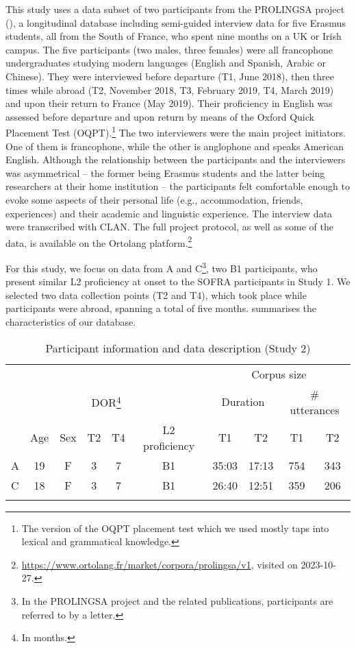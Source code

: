 \documentclass[output=paper]{langscibook}
\begin{document}
This study uses a data subset of two participants from the PROLINGSA project (\citealt{LeclercqEtAl2021}), a longitudinal database including semi-guided interview data for five Erasmus students, all from the South of France, who spent nine months on a UK or Irish campus. The five participants (two males, three females) were all francophone undergraduates studying modern languages (English and Spanish, Arabic or Chinese). They were interviewed before departure (T1, June 2018), then three times while abroad (T2, November 2018, T3, February 2019, T4, March 2019) and upon their return to France (May 2019). Their proficiency in English was assessed before departure and upon return by means of the Oxford Quick Placement Test (OQPT).\footnote{The version of the OQPT placement test which we used mostly taps into lexical and grammatical knowledge.} The two interviewers were the main project initiators. One of them is francophone, while the other is anglophone and speaks American English. Although the relationship between the participants and the interviewers was asymmetrical – the former being Erasmus students and the latter being researchers at their home institution – the participants felt comfortable enough to evoke some aspects of their personal life (e.g., accommodation, friends, experiences) and their academic and linguistic experience. The interview data were transcribed with CLAN. The full project protocol, as well as some of the data, is available on the Ortolang platform.\footnote{\url{https://www.ortolang.fr/market/corpora/prolingsa/v1}, visited on 2023-10-27.}

For this study, we focus on data from A and C\footnote{In the PROLINGSA project and the related publications, participants are referred to by a letter.}, two B1 participants, who present similar L2 proficiency at onset to the SOFRA participants in Study 1. We selected two data collection points (T2 and T4), which took place while participants were abroad, spanning a total of five months.  summarises the characteristics of our database.

\begin{table}
\begin{tabular}{lccccccccc}
	\lsptoprule
	&  &  & & &  {} & \multicolumn{4}{c}{Corpus size} \\\cmidrule(lr){7-10}
	&  &  & \multicolumn{2}{c}{DOR\footnote{In months.}}& {} &  \multicolumn{2}{c}{Duration} & \multicolumn{2}{c}{\# utterances}\\\cmidrule(lr){4-5}\cmidrule(lr){7-8}\cmidrule(lr){9-10}
	&  Age    &  Sex   & T2  & T4  & L2 proficiency & T1 & T2 & T1 & T2\\
	\midrule
	{A} & 19 & F & 3 & 7 & B1 & 35:03 & 17:13 & 754 & 343\\
	{C} & 18 & F & 3 & 7 & B1 & 26:40 & 12:51 & 359 & 206\\
	\lspbottomrule
\end{tabular}
\caption{Participant information and data description (Study 2)}
\label{tab:saddour:3}
\end{table}
\end{document}
